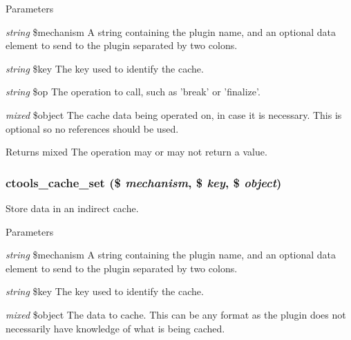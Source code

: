 \begin{DoxyParams}{Parameters}
\item[{\em string}]\$mechanism A string containing the plugin name, and an optional data element to send to the plugin separated by two colons.\item[{\em string}]\$key The key used to identify the cache.\item[{\em string}]\$op The operation to call, such as 'break' or 'finalize'.\item[{\em mixed}]\$object The cache data being operated on, in case it is necessary. This is optional so no references should be used.\end{DoxyParams}
\begin{DoxyReturn}{Returns}
mixed The operation may or may not return a value. 
\end{DoxyReturn}
\hypertarget{profiles_2dosomething_2modules_2contrib_2ctools_2includes_2cache_8inc_a631e9d4813f723aa49a49aa85f8c4c8c}{
\subsubsection[{ctools\_\-cache\_\-set}]{\setlength{\rightskip}{0pt plus 5cm}ctools\_\-cache\_\-set (\$ {\em mechanism}, \/  \$ {\em key}, \/  \$ {\em object})}}
\label{profiles_2dosomething_2modules_2contrib_2ctools_2includes_2cache_8inc_a631e9d4813f723aa49a49aa85f8c4c8c}
Store data in an indirect cache.


\begin{DoxyParams}{Parameters}
\item[{\em string}]\$mechanism A string containing the plugin name, and an optional data element to send to the plugin separated by two colons.\item[{\em string}]\$key The key used to identify the cache.\item[{\em mixed}]\$object The data to cache. This can be any format as the plugin does not necessarily have knowledge of what is being cached. \end{DoxyParams}

